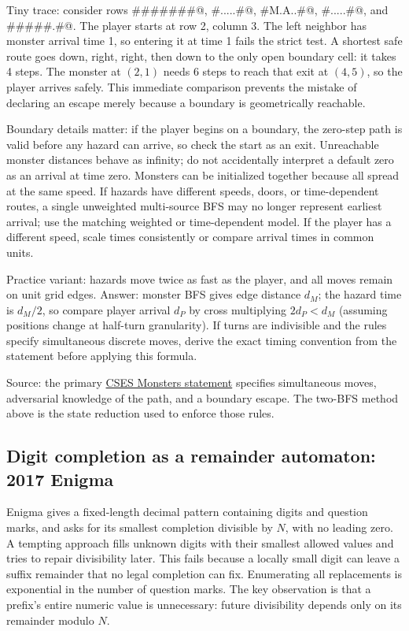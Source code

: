 Tiny trace: consider rows \verb@#######@, \verb@#.....#@,
\verb@#M.A..#@, \verb@#.....#@, and \verb@#####.#@. The player starts at
row 2, column 3. The left neighbor has monster arrival time 1, so entering
it at time 1 fails the strict test. A shortest safe route goes down, right,
right, then down to the only open boundary cell: it takes 4 steps. The
monster at $(2,1)$ needs 6 steps to reach that exit at $(4,5)$, so the
player arrives safely. This
immediate comparison prevents the
mistake of declaring an escape merely because a boundary is geometrically
reachable.

Boundary details matter: if the player begins on a boundary, the zero-step
path is valid before any hazard can arrive, so check the start as an exit.
Unreachable monster distances behave as infinity; do not accidentally
interpret a default zero as an arrival at time zero. Monsters can be
initialized together because all spread at the same speed. If hazards have
different speeds, doors, or time-dependent routes, a single unweighted
multi-source BFS may no longer represent earliest arrival; use the matching
weighted or time-dependent model. If the player has a different speed, scale
times consistently or compare arrival times in common units.

Practice variant: hazards move twice as fast as the player, and all moves
remain on unit grid edges. Answer: monster BFS gives edge distance $d_M$;
the hazard time is $d_M/2$, so compare player arrival $d_P$ by cross
multiplying $2d_P<d_M$ (assuming positions change at half-turn granularity).
If turns are indivisible and the rules specify simultaneous discrete moves,
derive the exact timing convention from the statement before applying this
formula.

Source: the primary \href{https://cses.fi/problemset/task/1194/}{CSES Monsters statement} specifies simultaneous moves, adversarial knowledge of the path, and a boundary escape. The two-BFS method above is the state reduction used to enforce those rules.

\subsection{Digit completion as a remainder automaton: 2017 Enigma}
\label{case:enigma}

Enigma gives a fixed-length decimal pattern containing digits and question
marks, and asks for its smallest completion divisible by $N$, with no leading
zero. A tempting approach fills unknown digits with their smallest allowed values
and tries to repair divisibility later. This fails because a locally small digit can leave a suffix remainder
that no legal completion can fix. Enumerating all replacements is
exponential in the number of question marks. The key observation is that a
prefix's entire numeric value is unnecessary: future divisibility depends
only on its remainder modulo $N$.

